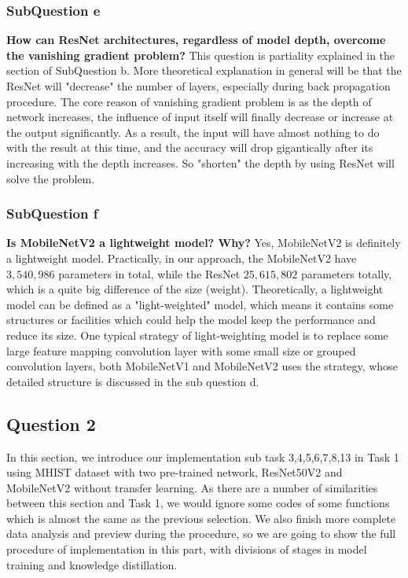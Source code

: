 \documentclass[conference]{IEEEtran}
\begin{document}
\subsubsection{SubQuestion e} \textbf{How can ResNet architectures, regardless of model depth, overcome the vanishing gradient problem?}
This question is partiality explained in the section of SubQuestion b. More theoretical explanation in general will be that the ResNet will "decrease" the number of layers, especially during back propagation procedure. The core reason of vanishing gradient problem is as the depth of network increases, the influence of input itself will finally decrease or increase at the output significantly. As a result, the input will have almost nothing to do with the result at this time, and the accuracy will drop gigantically after its increasing with the depth increases. So "shorten" the depth by using ResNet will solve the problem.

\subsubsection{SubQuestion f} \textbf{Is MobileNetV2 a lightweight model? Why?}
Yes, MobileNetV2 is definitely a lightweight model. Practically, in our approach, the MobileNetV2 have $3,540,986$ parameters in total, while the ResNet $25,615,802$ parameters totally, which is a quite big difference of the size (weight). Theoretically, a lightweight model can be defined as a "light-weighted" model, which means it contains some structures or facilities which could help the model keep the performance and reduce its size. One typical strategy of light-weighting model is to replace some large feature mapping convolution layer with some small size or grouped convolution layers, both MobileNetV1 and MobileNetV2 uses the strategy, whose detailed structure is discussed in the sub question d.

\subsection{Question 2} In this section, we introduce our implementation sub task 3,4,5,6,7,8,13 in Task 1 using MHIST dataset with two pre-trained network, ResNet50V2 and MobileNetV2 without transfer learning. As there are a number of similarities between this section and Task 1, we would ignore some codes of some functions which is almost the same as the previous selection. We also finish more complete data analysis and preview during the procedure, so we are going to show the full procedure of implementation in this part, with divisions of stages in model training and knowledge distillation.
\end{document}
